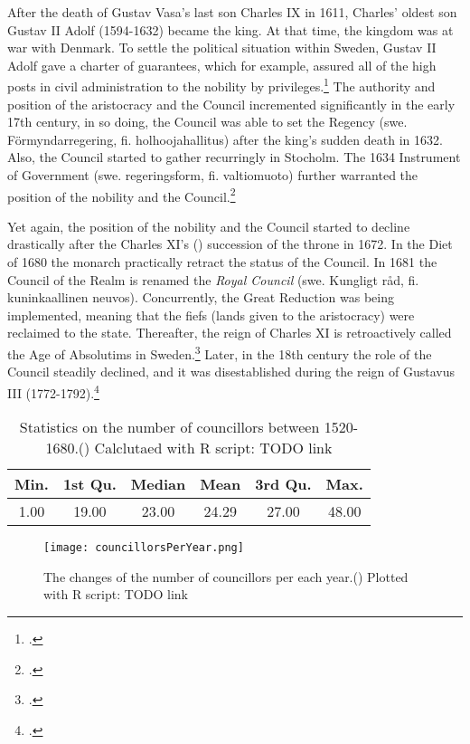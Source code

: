 After the death of Gustav Vasa's last son Charles IX in 1611, Charles' oldest son Gustav II Adolf (1594-1632) became the king. At that time, the kingdom was at war with Denmark. To settle the political situation within Sweden, Gustav II Adolf gave a charter of guarantees, which for example, assured all of the high posts in civil administration to the nobility by privileges.\footcites[p. 121-123,]{pSuurvalta}[p. 8-9.]{personalAgency} The authority and position of the aristocracy and the Council incremented significantly in the early 17th century, in so doing, the Council was able to set the Regency (swe. Förmyndarregering, fi. holhoojahallitus) after the king's sudden death in 1632. Also, the Council started to gather recurringly in Stocholm. The 1634 Instrument of Government (swe. regeringsform, fi. valtiomuoto) further warranted the position of the nobility and the Council.\footcites[p. 195-197,]{pSuurvalta}[p. 8-9.]{personalAgency}

Yet again, the position of the nobility and the Council started to decline drastically after the Charles XI's () succession of the throne in 1672. In the Diet of 1680 the monarch practically retract the status of the Council. In 1681 the Council of the Realm is renamed the \textit{Royal Council} (swe. Kungligt råd, fi. kuninkaallinen neuvos). Concurrently, the Great Reduction was being implemented, meaning that the fiefs (lands given to the aristocracy) were reclaimed to the state. Thereafter, the reign of Charles XI is retroactively called the Age of Absolutims in Sweden.\footcites[p. 289-295,]{pSuurvalta}[p. 8-9.]{personalAgency} Later, in the 18th century the role of the Council steadily declined, and it was disestablished during the reign of Gustavus III (1772-1792).\footcite[p. 14.]{hopesAndFearsIntro}

\begin{table}
	\caption{Statistics on the number of councillors between 1520-1680.(\cite{councillorsDS}) Calclutaed with R script: TODO link}
	\label{tab:councillors}
	\centering
\begin{tabular}{c c c c c c}
	\hline
	Min. & 1st Qu. & Median & Mean & 3rd Qu. & Max.\\
	\hline
	1.00 & 19.00 & 23.00 & 24.29 & 27.00 & 48.00\\
	\hline
\end{tabular}
\end{table}

\begin{figure}[h]
	\texttt{[image: councillorsPerYear.png]}
	\centering
	\caption{The changes of the number of councillors per each year.(\cite{councillorsDS}) Plotted with R script: TODO link} 
	\centering
	\label{fig:peryear}
\end{figure}

